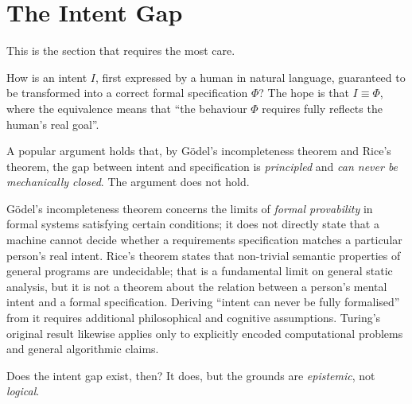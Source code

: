 \section{The Intent Gap}\label{sec:intent-gap}

This is the section that requires the most care.

\begin{problem}
How is an intent $I$, first expressed by a human in natural language, guaranteed to be
transformed into a correct formal specification $\Phi$? The hope is that $I \equiv \Phi$,
where the equivalence means that ``the behaviour $\Phi$ requires fully reflects the human's
real goal''.
\end{problem}

A popular argument holds that, by G\"odel's incompleteness theorem and Rice's theorem, the
gap between intent and specification is \emph{principled} and \emph{can never be
mechanically closed}. The argument does not hold.

\begin{proposition}\label{prop:no-godel}
G\"odel's incompleteness theorem concerns the limits of \emph{formal provability} in formal
systems satisfying certain conditions; it does not directly state that a machine cannot
decide whether a requirements specification matches a particular person's real intent.
Rice's theorem \cite{rice1953} states that non-trivial semantic properties of general
programs are undecidable; that is a fundamental limit on general static analysis, but it is
not a theorem about the relation between a person's mental intent and a formal
specification. Deriving ``intent can never be fully formalised'' from it requires additional
philosophical and cognitive assumptions. Turing's original result \cite{turing1936}
likewise applies only to explicitly encoded computational problems and general algorithmic
claims.
\end{proposition}

Does the intent gap exist, then? It does, but the grounds are \emph{epistemic}, not
\emph{logical}.

